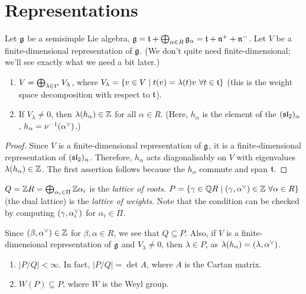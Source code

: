 \section{Representations}

Let $\g$ be a semisimple Lie algebra,
$\g = \at + \bigoplus_{\alpha \in R} \g_\alpha = \at + \fn^+ + \fn^-$. Let $V$
be a finite-dimensional representation of $\g$. (We don't quite need
finite-dimensional; we'll see exactly what we need a bit later.)

\begin{proposition}\leavevmode
\begin{enumerate}
  \item $V = \bigoplus_{\lambda \in \at^*} V_\lambda$, where
    $V_\lambda = \setc{v \in V}{t(v) = \lambda(t)v \ \forall t \in \at}$ (this
    is the weight space decomposition with respect to $\at$).
  \item If $V_\lambda \neq 0$, then $\lambda(h_\alpha) \in \Z$ for all
    $\alpha \in R$. (Here, $h_\alpha$ is the element of the $(\sl_2)_\alpha$,
    $h_\alpha = \nu^{-1}(\alpha\cv)$.)
\end{enumerate}
\end{proposition}

\begin{proof}
Since $V$ is a finite-dimensional representation of $\g$, it is a
finite-dimensional representation of $(\sl_2)_\alpha$. Therefore, $h_\alpha$
acts diagonalisably on $V$ with eigenvalues $\lambda(h_\alpha) \in \Z$. The
first assertion follows because the $h_\alpha$ commute and span $\at$.
\end{proof}

\begin{definition}
$Q = \Z R = \bigoplus_{\alpha_i \in \Pi} \Z\alpha_i$ is the \emph{lattice of
roots}.
$P = \setc{\gamma \in \Q R}{(\gamma, \alpha\cv) \in \Z \ \forall \alpha \in R}$
(the dual lattice) is the \emph{lattice of weights}. Note that the condition
can be checked by computing $(\gamma, \alpha_i\cv)$ for $\alpha_i \in \Pi$.
\end{definition}

Since $(\beta, \alpha\cv) \in \Z$ for $\beta, \alpha \in R$, we see that
$Q \subseteq P$. Also, if $V$ is a finite-dimensional representation of $\g$
and $V_\lambda \neq 0$, then $\lambda \in P$, as
$\lambda(h_\alpha) = (\lambda, \alpha\cv)$.

\begin{exercise}\leavevmode
\begin{enumerate}
  \item $|P/Q| < \infty$. In fact, $|P/Q| = \det A$, where $A$ is the Cartan
    matrix.
  \item $W(P) \subseteq P$, where $W$ is the Weyl group.
\end{enumerate}
\end{exercise}

